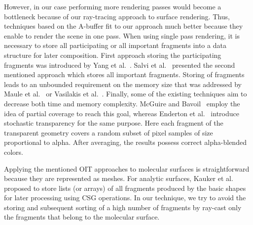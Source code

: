 However, in our case performing more rendering passes would become a bottleneck because of our ray-tracing approach to surface rendering.
Thus, techniques based on the A-buffer fit to our approach much better because they enable to render the scene in one pass.
When using single pass rendering, it is necessary to store all participating or all important fragments into a data structure for later composition.
First approach storing the participating fragments was introduced by Yang et al.~\cite{yang2010real}. Salvi et al.~\cite{salvi2011adaptive} presented the second mentioned approach which stores all important fragments.
Storing of fragments leads to an unbounded requirement on the memory size that was addressed by Maule et al.~\cite{maule2012memory} or Vasilakis et al.~\cite{vasilakis2015k+buffer}.
Finally, some of the existing techniques aim to decrease both time and memory complexity.
McGuire and Bavoil~\cite{mcguire2013weighted} employ the idea of partial coverage to reach this goal, whereas Enderton et al.~\cite{enderton2011stochastic} introduce stochastic transparency for the same purpose. 
Here each fragment of the transparent geometry covers a random subset of pixel samples of size proportional to alpha. 
After averaging, the results possess correct alpha-blended colors. 

Applying the mentioned OIT approaches to molecular surfaces is straightforward because they are represented as meshes.
For analytic surfaces, Kauker et al.~\cite{kauker2013rendering} proposed to store lists (or arrays) of all fragments produced by the basic shapes for later processing using CSG operations.
In our technique, we try to avoid the storing and subsequent sorting of a high number of fragments by ray-cast only the fragments that belong to the molecular surface.




